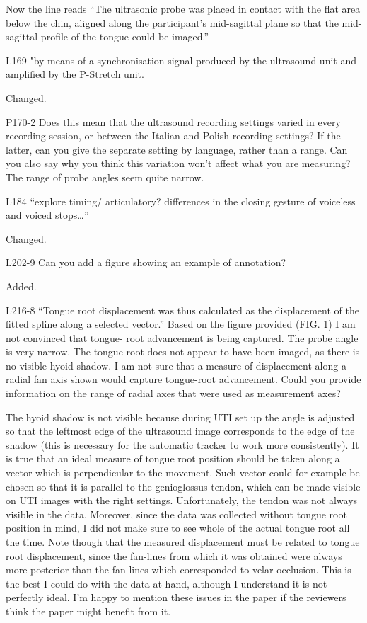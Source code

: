 \documentclass[]{article}
\begin{document}
\color{plum}

Now the line reads ``The ultrasonic probe was placed in contact with the
flat area below the chin, aligned along the participant's mid-sagittal
plane so that the mid-sagittal profile of the tongue could be imaged.''
\color{black}

L169 "by means of a synchronisation signal produced by the ultrasound
unit and amplified by the P-Stretch unit.

\color{plum}

Changed. \color{black}

P170-2 Does this mean that the ultrasound recording settings varied in
every recording session, or between the Italian and Polish recording
settings? If the latter, can you give the separate setting by language,
rather than a range. Can you also say why you think this variation won't
affect what you are measuring? The range of probe angles seem quite
narrow.

L184 ``explore timing/ articulatory? differences in the closing gesture
of voiceless and voiced stops\ldots{}''

\color{plum}

Changed. \color{black}

L202-9 Can you add a figure showing an example of annotation?

\color{plum}

Added. \color{black}

L216-8 ``Tongue root displacement was thus calculated as the
displacement of the fitted spline along a selected vector.'' Based on
the figure provided (FIG. 1) I am not convinced that tongue- root
advancement is being captured. The probe angle is very narrow. The
tongue root does not appear to have been imaged, as there is no visible
hyoid shadow. I am not sure that a measure of displacement along a
radial fan axis shown would capture tongue-root advancement. Could you
provide information on the range of radial axes that were used as
measurement axes?

\color{plum}

The hyoid shadow is not visible because during UTI set up the angle is
adjusted so that the leftmost edge of the ultrasound image corresponds
to the edge of the shadow (this is necessary for the automatic tracker
to work more consistently). It is true that an ideal measure of tongue
root position should be taken along a vector which is perpendicular to
the movement. Such vector could for example be chosen so that it is
parallel to the genioglossus tendon, which can be made visible on UTI
images with the right settings. Unfortunately, the tendon was not always
visible in the data. Moreover, since the data was collected without
tongue root position in mind, I did not make sure to see whole of the
actual tongue root all the time. Note though that the measured
displacement must be related to tongue root displacement, since the
fan-lines from which it was obtained were always more posterior than the
fan-lines which corresponded to velar occlusion. This is the best I
could do with the data at hand, although I understand it is not
perfectly ideal. I'm happy to mention these issues in the paper if the
reviewers think the paper might benefit from it. \color{black}
\end{document}
